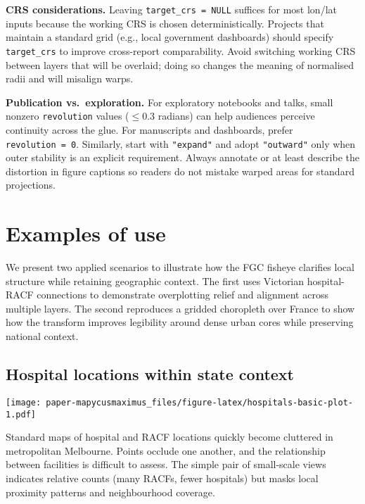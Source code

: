\textbf{CRS considerations.} Leaving \texttt{target\_crs\ =\ NULL} suffices for most lon/lat inputs because
the working CRS is chosen deterministically. Projects that maintain a standard grid (e.g., local
government dashboards) should specify \texttt{target\_crs} to improve cross-report comparability. Avoid
switching working CRS between layers that will be overlaid; doing so changes the meaning of
normalised radii and will misalign warps.

\textbf{Publication vs.~exploration.} For exploratory notebooks and talks, small nonzero
\texttt{revolution} values (\(\le 0.3\) radians) can help audiences perceive continuity across the glue.
For manuscripts and dashboards, prefer \texttt{revolution\ =\ 0}. Similarly, start with \texttt{"expand"} and
adopt \texttt{"outward"} only when outer stability is an explicit requirement. Always annotate or at
least describe the distortion in figure captions so readers do not mistake warped areas for standard
projections.

\hypertarget{examples-of-use}{%
\section{Examples of use}\label{examples-of-use}}

We present two applied scenarios to illustrate how the FGC fisheye clarifies local structure while retaining geographic context. The first uses Victorian hospital-RACF connections to demonstrate overplotting relief and alignment across multiple layers. The second reproduces a gridded choropleth over France to show how the transform improves legibility around dense urban cores while preserving national context.

\hypertarget{hospital-locations-within-state-context}{%
\subsection{Hospital locations within state context}\label{hospital-locations-within-state-context}}

\texttt{[image: paper-mapycusmaximus\_files/figure-latex/hospitals-basic-plot-1.pdf]}

Standard maps of hospital and RACF locations quickly become cluttered in metropolitan Melbourne. Points occlude one another, and the relationship between facilities is difficult to assess. The simple pair of small-scale views indicates relative counts (many RACFs, fewer hospitals) but masks local proximity patterns and neighbourhood coverage.

